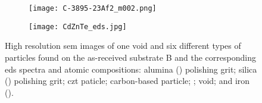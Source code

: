 \begin{figure}[htbp]
\begin{subfigure}[t]{\textwidth}
        \caption{}\label{fig:SEM_B_particulates_eds}
          \begin{minipage}[t]{0.43\linewidth}
            \centering
            \texttt{[image: C-3895-23Af2\_m002.png]}
          \end{minipage}
          \hfill
          \begin{minipage}[t]{0.43\linewidth}
            \centering
            \texttt{[image: CdZnTe\_eds.jpg]}
          \end{minipage}
          \begin{minipage}[t]{0.11\linewidth}
            \centering
            \atomicTable[&][&][&]
          \end{minipage}
    \end{subfigure}%
    \caption[\Ac{sem} images, \ac{eds} spectra, and \ac{eds} atomic compositions of one void and six different types of particles found on as-received substrate B.]{High resolution \ac{sem} images of one void and six different types of particles found on the as-received substrate B and the corresponding \ac{eds} spectra and atomic compositions:  alumina () polishing grit;  silica () polishing grit;  \ac{czt} paticle;  carbon-based particle;  ;  void; and  iron ().}\label{fig:subBa_sem_w_eds}
\end{figure}
%

